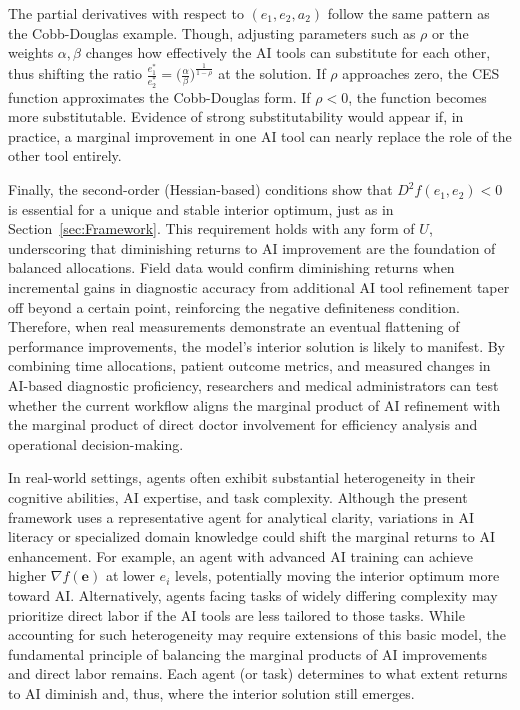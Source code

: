 \documentclass[11pt]{article}
\theoremstyle{definition}
\theoremstyle{remark}
\begin{document}
The partial derivatives with respect to $(e_1, e_2, a_2)$ follow the same pattern as the Cobb-Douglas example. Though, adjusting parameters such as $\rho$ or the weights $\alpha,\beta$ changes how effectively the AI tools can substitute for each other, thus shifting the ratio $\tfrac{e_1^*}{e_2^*}=\bigl(\tfrac{\alpha}{\beta}\bigr)^{\tfrac{1}{1-\rho}}$ at the solution. If $\rho$ approaches zero, the CES function approximates the Cobb-Douglas form. If $\rho < 0$, the function becomes more substitutable. Evidence of strong substitutability would appear if, in practice, a marginal improvement in one AI tool can nearly replace the role of the other tool entirely.

Finally, the second-order (Hessian-based) conditions show that $D^2 f(e_1,e_2)<0$ is essential for a unique and stable interior optimum, just as in Section~\ref{sec:Framework}. This requirement holds with any form of $U$, underscoring that diminishing returns to AI improvement are the foundation of balanced allocations. Field data would confirm diminishing returns when incremental gains in diagnostic accuracy from additional AI tool refinement taper off beyond a certain point, reinforcing the negative definiteness condition. Therefore, when real measurements demonstrate an eventual flattening of performance improvements, the model’s interior solution is likely to manifest. By combining time allocations, patient outcome metrics, and measured changes in AI-based diagnostic proficiency, researchers and medical administrators can test whether the current workflow aligns the marginal product of AI refinement with the marginal product of direct doctor involvement for efficiency analysis and operational decision-making.

In real-world settings, agents often exhibit substantial heterogeneity in their cognitive abilities, AI expertise, and task complexity. Although the present framework uses a representative agent for analytical clarity, variations in AI literacy or specialized domain knowledge could shift the marginal returns to AI enhancement. For example, an agent with advanced AI training can achieve higher $\nabla f(\mathbf{e})$ at lower $e_i$ levels, potentially moving the interior optimum more toward AI. Alternatively, agents facing tasks of widely differing complexity may prioritize direct labor if the AI tools are less tailored to those tasks. While accounting for such heterogeneity may require extensions of this basic model, the fundamental principle of balancing the marginal products of AI improvements and direct labor remains. Each agent (or task) determines to what extent returns to AI diminish and, thus, where the interior solution still emerges.
\end{document}
